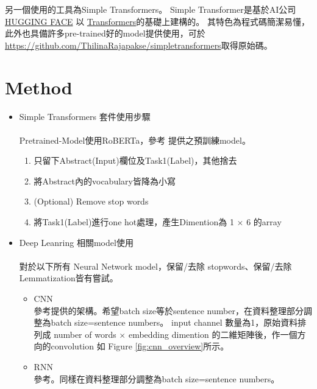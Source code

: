 \documentclass[8pt,a4paper]{article}
\begin{document}
另一個使用的工具為Simple Transformers。
Simple Transformer是基於AI公司\href{https://huggingface.co/}{HUGGING FACE} 以 \href{https://github.com/huggingface/transformers}{Transformers}的基礎上建構的。
其特色為程式碼簡潔易懂，此外也具備許多pre-trained好的model提供使用，可於\url{https://github.com/ThilinaRajapakse/simpletransformers}取得原始碼。\\

\section*{Method} 
\label{sec:Method}

\begin{itemize}
    \item Simple Transformers 套件使用步驟\\ \\
    Pretrained-Model使用RoBERTa，參考 \cite{liu2019roberta} 提供之預訓練model。
        \begin{enumerate}
            \item 只留下Abstract(Input)欄位及Task1(Label)，其他捨去
            \item 將Abstract內的vocabulary皆降為小寫
            \item (Optional) Remove stop words
            \item 將Task1(Label)進行one hot處理，產生Dimention為 1 $\times$ 6 的array
        \end{enumerate}
    \item Deep Leanring 相關model使用 \\ \\ 
    對於以下所有 Neural Network model，保留/去除 stopwords、保留/去除Lemmatization皆有嘗試。
        \begin{itemize}
            \item CNN\\
            參考\cite{gehrmann2018}提供的架構。希望batch size等於sentence number，在資料整理部分調整為batch size=sentence numbers。
            input channel 數量為1，原始資料排列成 number of words $\times$ embedding dimention 的二維矩陣後，作一個方向的convolution 如 Figure \ref{fig:cnn_overview}所示。\\
            \item RNN\\
            參考\cite{lai2015}。同樣在資料整理部分調整為batch size=sentence numbers。\\

\end{itemize}
\end{itemize}
\end{document}
